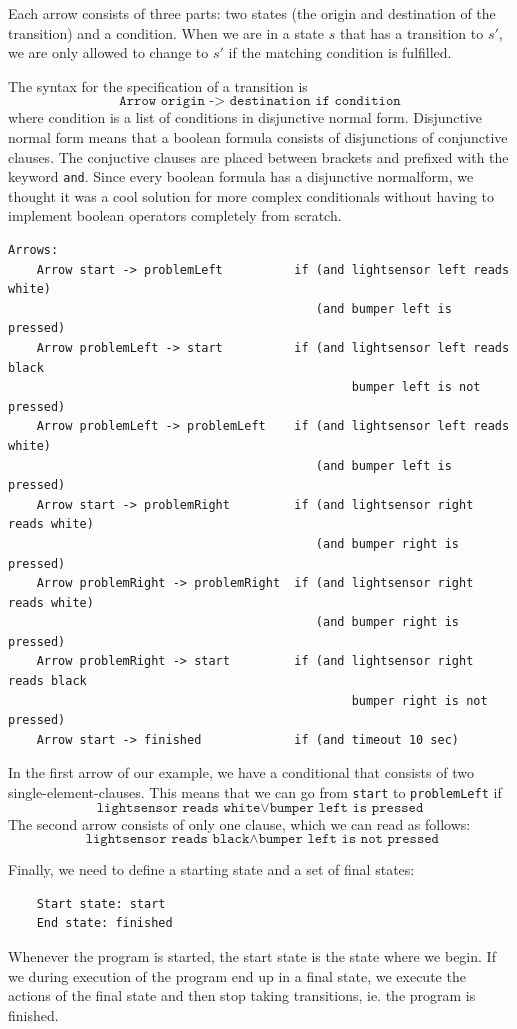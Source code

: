 \documentclass[11pt,a4paper]{article}
\begin{document}
Each arrow consists of three parts: two states (the origin and destination of the transition) and a condition. When we are in a state $s$ that has a transition to $s'$, we are only allowed to change to $s'$ if the matching condition is fulfilled. 

The syntax for the specification of a transition is
\[ \texttt{Arrow origin -> destination	if condition} \]
where condition is a list of conditions in disjunctive normal form. 
Disjunctive normal form means that a boolean formula consists of disjunctions of conjunctive clauses. The conjuctive clauses are placed between brackets and prefixed with the keyword \texttt{and}.
Since every boolean formula has a disjunctive normalform, we thought it was a cool solution for more complex conditionals without having to implement boolean operators completely from scratch. 

\begin{verbatim}
Arrows: 
    Arrow start -> problemLeft          if (and lightsensor left reads white) 
                                           (and bumper left is pressed)
    Arrow problemLeft -> start          if (and lightsensor left reads black 
                                                bumper left is not pressed)
    Arrow problemLeft -> problemLeft    if (and lightsensor left reads white) 
                                           (and bumper left is pressed)
    Arrow start -> problemRight         if (and lightsensor right reads white) 
                                           (and bumper right is pressed)
    Arrow problemRight -> problemRight  if (and lightsensor right reads white) 
                                           (and bumper right is pressed)
    Arrow problemRight -> start         if (and lightsensor right reads black 
                                                bumper right is not pressed)
    Arrow start -> finished             if (and timeout 10 sec)

\end{verbatim}

In the first arrow of our example, we have a conditional that consists of two single-element-clauses. This means that we can go from \texttt{start} to \texttt{problemLeft} if
\[ \texttt{lightsensor reads white} \vee \texttt{bumper left is pressed} \]
The second arrow consists of only one clause, which we can read as follows:
\[ \texttt{ lightsensor reads black} \wedge \texttt{bumper left is not pressed} \]

Finally, we need to define a starting state and a set of final states:
\begin{verbatim}
    Start state: start 
    End state: finished
\end{verbatim}
Whenever the program is started, the start state is the state where we begin. 
If we during execution of the program end up in a final state, we execute the actions of the final state and then stop taking transitions, ie. the program is finished.
\end{document}
